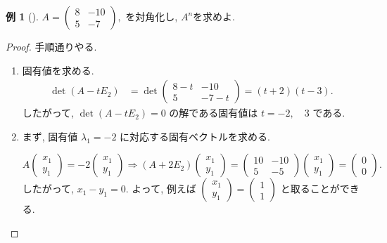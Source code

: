 \documentclass[dvipdfmx,a4paper,11pt]{article} %
\theoremstyle{definition}
\newtheorem{eg}[thm]{例}
\begin{document}
\begin{eg}
[{\cite[例題5.4.1]{M}}]
\(
A=
\begin{pmatrix}
8&-10\\
5&-7
\end{pmatrix},
\)
を対角化し, $A^n$を求めよ.

\begin{proof}

手順通りやる. 

\begin{enumerate}
  \setlength{\parskip}{0cm}
  \setlength{\itemsep}{0pt}

\item[手順1.]
固有値を求める.
\begin{align*}
\det(A-tE_2)
&=
\det
\begin{pmatrix}
8-t&-10\\
5&-7-t
\end{pmatrix} 
=(t+2)(t-3).
\end{align*}
したがって,
\(
\det(A-tE_2)=0
\)
の解である固有値は
\(
t=-2,\quad 3
\)
である. 

\item[手順2.]
まず, 固有値 $\lambda_1=-2$ に対応する固有ベクトルを求める.

\[
A
\begin{pmatrix}
x_1\\
y_1
\end{pmatrix}
=
-2
\begin{pmatrix}
x_1\\
y_1
\end{pmatrix}
\Rightarrow
(A+2E_2)
\begin{pmatrix}
x_1\\
y_1
\end{pmatrix}
=
\begin{pmatrix}
10&-10\\
5&-5
\end{pmatrix}
\begin{pmatrix}
x_1\\
y_1
\end{pmatrix}
=
\begin{pmatrix}
0\\
0
\end{pmatrix}.
\]
したがって,
\(
x_1-y_1=0.
\)
よって, 例えば
\(
\begin{pmatrix}
x_1\\
y_1
\end{pmatrix}
=
\begin{pmatrix}
1\\
1
\end{pmatrix}
\)
と取ることができる.


\end{enumerate}
\end{proof}
\end{eg}
\end{document}
